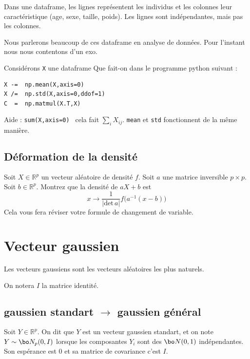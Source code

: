 \documentclass{article}
\begin{document}
Dans une dataframe, les lignes  représentent  les individus et les colonnes leur caractéristique (age, sexe, taille, poids).   Les lignes sont indépendantes, mais pas les colonnes.  


Nous parlerons beaucoup de ces dataframe en analyse de données.  Pour l'instant nous nous contentons d'un exo.


\begin{exo} Considérons \verb$X$ une dataframe Que fait-on dans le programme python suivant :
\begin{verbatim}
X -=  np.mean(X,axis=0) 
X /=  np.std(X,axis=0,ddof=1) 
C  =  np.matmul(X.T,X)   
\end{verbatim}
Aide :  \verb$sum(X,axis=0) $ cela fait  $\sum_i X_{ij} $.  \verb$mean$ et  \verb$std$ fonctionnent de la même manière. 
\end{exo}






\subsection{Déformation de la densité}

Soit $X\in \mathbb R^p$ un vecteur aléatoire de densité $f$. Soit $a$ une matrice inversible $p\times p$. Soit $b\in \mathbb R^p$. Montrez que la densité de $aX+b$ est
$$
x\to   \frac 1 {|  \mathrm{det} \,a  |} f \Big(  a^{-1} (x-b)  \Big ) 
$$ 
Cela vous fera réviser votre formule de changement de variable.


\section{Vecteur gaussien}


Les vecteurs gaussiens sont les vecteurs aléatoires les plus naturels. 

On notera $I$ la matrice identité.  


\subsection{gaussien standart $\to$  gaussien général}


 \begin{definition}  Soit $Y\in \mathbb R^p$. On dit que $Y$ est un vecteur gaussien standart, et on note $Y\sim \bo N_p(0,I) $  lorsque les composantes $Y_i$  sont des $\bo N(0,1)$ indépendantes.  Son espérance est $0$ et sa matrice de covariance c'est $I$. 
\end{definition}
\end{document}
